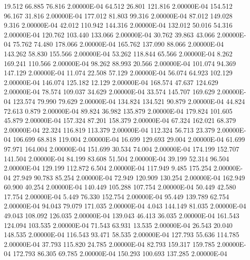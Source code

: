     19.512    66.885    76.816  2.00000E-04
    64.512    26.801   121.816  2.00000E-04
   154.512    96.167    31.816  2.00000E-04
   177.012    81.803    99.316  2.00000E-04
    87.012   149.028     9.316  2.00000E-04
    42.012   110.942   144.316  2.00000E-04
   132.012    50.016    54.316  2.00000E-04
   120.762   103.440   133.066  2.00000E-04
    30.762    39.863    43.066  2.00000E-04
    75.762    74.480   178.066  2.00000E-04
   165.762   137.090    88.066  2.00000E-04
   143.262    58.830   155.566  2.00000E-04
    53.262   118.844    65.566  2.00000E-04
     8.262   169.241   110.566  2.00000E-04
    98.262    88.993    20.566  2.00000E-04
   101.074    94.369   147.129  2.00000E-04
    11.074    22.508    57.129  2.00000E-04
    56.074    64.923   102.129  2.00000E-04
   146.074   125.182    12.129  2.00000E-04
   168.574    47.637   124.629  2.00000E-04
    78.574   109.037    34.629  2.00000E-04
    33.574   145.707   169.629  2.00000E-04
   123.574    79.990    79.629  2.00000E-04
   134.824   134.521    90.879  2.00000E-04
    44.824    72.613     0.879  2.00000E-04
    89.824    36.982   135.879  2.00000E-04
   179.824   101.605    45.879  2.00000E-04
   157.324    87.201   158.379  2.00000E-04
    67.324   162.021    68.379  2.00000E-04
    22.324   116.819   113.379  2.00000E-04
   112.324    56.713    23.379  2.00000E-04
   106.699    68.818   119.004  2.00000E-04
    16.699   129.693    29.004  2.00000E-04
    61.699    97.971   164.004  2.00000E-04
   151.699    30.534    74.004  2.00000E-04
   174.199   152.707   141.504  2.00000E-04
    84.199    83.608    51.504  2.00000E-04
    39.199    52.314    96.504  2.00000E-04
   129.199   112.872     6.504  2.00000E-04
   117.949     9.485   175.254  2.00000E-04
    27.949    90.783    85.254  2.00000E-04
    72.949   120.909   130.254  2.00000E-04
   162.949    60.900    40.254  2.00000E-04
   140.449   105.288   107.754  2.00000E-04
    50.449    42.580    17.754  2.00000E-04
     5.449    76.330   152.754  2.00000E-04
    95.449   139.789    62.754  2.00000E-04
    94.043    79.079   171.035  2.00000E-04
     4.043   144.149    81.035  2.00000E-04
    49.043   108.092   126.035  2.00000E-04
   139.043    46.413    36.035  2.00000E-04
   161.543   124.094   103.535  2.00000E-04
    71.543    63.931    13.535  2.00000E-04
    26.543    20.040   148.535  2.00000E-04
   116.543    93.471    58.535  2.00000E-04
   127.793    55.636   114.785  2.00000E-04
    37.793   115.820    24.785  2.00000E-04
    82.793   159.317   159.785  2.00000E-04
   172.793    86.305    69.785  2.00000E-04
   150.293   100.693   137.285  2.00000E-04

